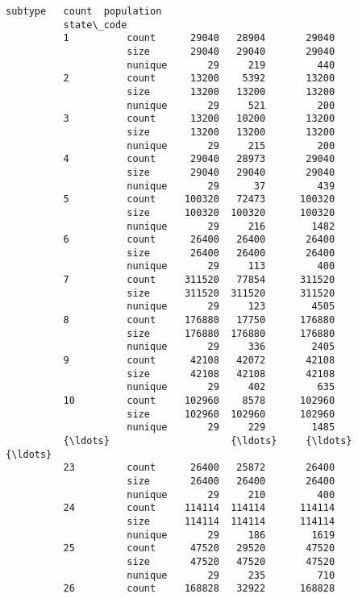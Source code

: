 \documentclass[11pt]{article}
\begin{document}
\begin{Verbatim}[commandchars=\\\{\}]
                              subtype   count  population  
          state\_code                                       
          1          count      29040   28904       29040  
                     size       29040   29040       29040  
                     nunique       29     219         440  
          2          count      13200    5392       13200  
                     size       13200   13200       13200  
                     nunique       29     521         200  
          3          count      13200   10200       13200  
                     size       13200   13200       13200  
                     nunique       29     215         200  
          4          count      29040   28973       29040  
                     size       29040   29040       29040  
                     nunique       29      37         439  
          5          count     100320   72473      100320  
                     size      100320  100320      100320  
                     nunique       29     216        1482  
          6          count      26400   26400       26400  
                     size       26400   26400       26400  
                     nunique       29     113         400  
          7          count     311520   77854      311520  
                     size      311520  311520      311520  
                     nunique       29     123        4505  
          8          count     176880   17750      176880  
                     size      176880  176880      176880  
                     nunique       29     336        2405  
          9          count      42108   42072       42108  
                     size       42108   42108       42108  
                     nunique       29     402         635  
          10         count     102960    8578      102960  
                     size      102960  102960      102960  
                     nunique       29     229        1485  
          {\ldots}                     {\ldots}     {\ldots}         {\ldots}  
          23         count      26400   25872       26400  
                     size       26400   26400       26400  
                     nunique       29     210         400  
          24         count     114114  114114      114114  
                     size      114114  114114      114114  
                     nunique       29     186        1619  
          25         count      47520   29520       47520  
                     size       47520   47520       47520  
                     nunique       29     235         710  
          26         count     168828   32922      168828  

\end{Verbatim}
\end{document}
